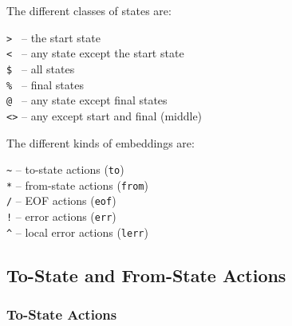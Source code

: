 \documentclass[letterpaper,11pt,oneside]{book}
\begin{document}
\begin{multicols}{2}
The different classes of states are:

\noindent\hspace*{24pt}\verb|> | -- the start state\\
\noindent\hspace*{24pt}\verb|< | -- any state except the start state\\
\noindent\hspace*{24pt}\verb|$ | -- all states\\
\noindent\hspace*{24pt}\verb|% | -- final states\\
\noindent\hspace*{24pt}\verb|@ | -- any state except final states\\
\noindent\hspace*{24pt}\verb|<>| -- any except start and final (middle)
\vspace{12pt}

\columnbreak

The different kinds of embeddings are:

\noindent\hspace*{24pt}\verb|~| -- to-state actions (\verb|to|)\\
\noindent\hspace*{24pt}\verb|*| -- from-state actions (\verb|from|)\\
\noindent\hspace*{24pt}\verb|/| -- EOF actions (\verb|eof|)\\
\noindent\hspace*{24pt}\verb|!| -- error actions (\verb|err|)\\
\noindent\hspace*{24pt}\verb|^| -- local error actions (\verb|lerr|)
\vspace{12pt}

\end{multicols}

\subsection{To-State and From-State Actions}

\subsubsection{To-State Actions}
\end{document}
